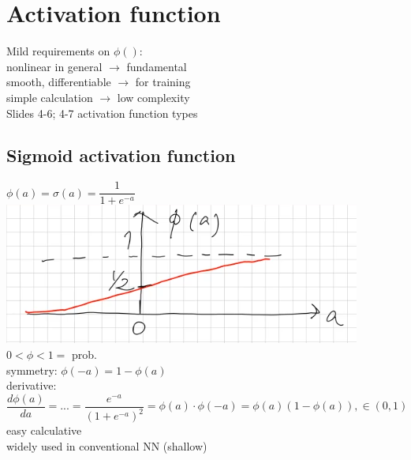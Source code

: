 
\section{Activation function}
Mild requirements on $ \phi() $: \\
\textbullet nonlinear in general $ \rightarrow $ fundamental \\
\textbullet smooth, differentiable $ \rightarrow $ for training \\
\textbullet simple calculation $ \rightarrow $ low complexity \\
\textbullet Slides 4-6; 4-7 activation function types \\

\subsection{Sigmoid activation function}
$ \phi (a) = \sigma (a) = \dfrac{1}{1 + e^{-a}} $ \\
\includegraphics[width=\linewidth]{Images/SigmoidActivationSketch.png}\\
\textbullet $  0 < \phi < 1 \overset {\hat{}}{=}  $ prob.\\
\textbullet symmetry: $ \phi(-a) = 1-\phi(a)  $ \\
\textbullet derivative: $ \dfrac{d \phi(a) }{da} = ... = \dfrac{e^{-a}}{(1+ e^{-a})^2}  = \phi (a) \cdot \phi (-a ) = \phi (a) (1- \phi (a) ), \in (0,1) $\\
easy calculative \\
\textbullet widely used in conventional NN (shallow) \\
